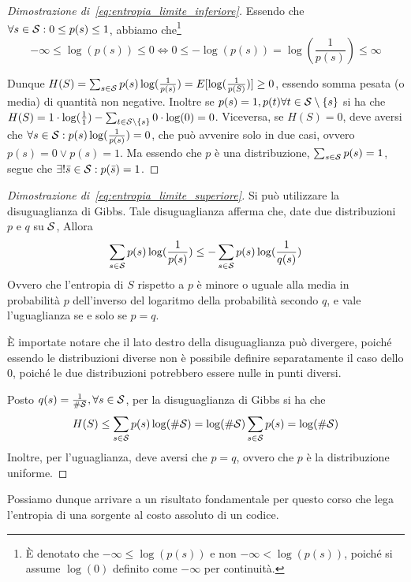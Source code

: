 \begin{proof}[Dimostrazione di~\ref{eq:entropia_limite_inferiore}]
  Essendo che \(\forall s \in \mathcal{S}: 0\leq p(s) \leq 1\), abbiamo che\footnote{È denotato che \(-\infty \leq \log(p(s))\) e non \(-\infty < \log(p(s))\), poiché si assume \(\log(0)\) definito come \(-\infty\) per continuità.}
  \[-\infty \leq \log(p(s)) \leq 0 \iff  0 \leq -\log(p(s)) = \log(\frac{1}{p(s)}) \leq \infty\]

  Dunque \(H(S) = \sum_{s \in \mathcal{S}} p(s) \log(\frac{1}{p(s)}) = E[\log(\frac{1}{p(S)})] \geq 0\), essendo somma pesata (o media) di quantità non negative.
  Inoltre se \(p(s) = 1, p(t) \forall t \in \SCal \setminus \set{s}\) si ha che \(H(S) = 1 \cdot \log(\frac{1}{1}) - \sum_{t \in \SCal \setminus \set{s}} 0 \cdot \log(0) = 0\).
  Viceversa, se \(H(S) = 0\), deve aversi che \(\forall s \in \mathcal{S}: p(s) \log(\frac{1}{p(s)}) = 0\), che può avvenire solo in due casi, ovvero \(p(s) = 0 \lor p(s) = 1\).
  Ma essendo che \(p\) è una distribuzione, \(\sum_{s \in \mathcal{S}} p(s) = 1\), segue che  \(\exists!\bar{s} \in \mathcal{S}: p(\bar{s}) = 1\).
\end{proof}

\begin{proof}[Dimostrazione di~\ref{eq:entropia_limite_superiore}]
  Si può utilizzare la disuguaglianza di Gibbs.
  Tale disuguaglianza afferma che, date due distribuzioni \(p\) e \(q\) su \(\mathcal{S}\), Allora
  \[ \sum_{s \in \mathcal{S}} p(s) \log(\frac{1}{p(s)}) \leq -\sum_{s \in \mathcal{S}} p(s) \log(\frac{1}{q(s)})\]
  Ovvero che l'entropia di \(S\) rispetto a \(p\) è minore o uguale alla media in probabilità \(p\) dell'inverso del logaritmo della probabilità secondo \(q\), e vale l'uguaglianza se e solo se \(p = q\).
  \begin{note}
    È importate notare che il lato destro della disuguaglianza può divergere, poiché essendo le distribuzioni diverse non è possibile definire separatamente il caso dello \(0\), poiché le due distribuzioni potrebbero essere nulle in punti diversi.
  \end{note}
  Posto \(q(s) = \frac{1}{\#\mathcal{S}}, \forall s \in \mathcal{S}\), per la disuguaglianza di Gibbs si ha che
  \[H(S) \leq \sum_{s \in \mathcal{S}} p(s) \log(\#\mathcal{S}) = \log(\#\mathcal{S})\sum_{s \in \mathcal{S}} p(s) = \log(\#\mathcal{S})\]
  Inoltre, per l'uguaglianza, deve aversi che \(p = q\), ovvero che \(p\) è la distribuzione uniforme.
\end{proof}

Possiamo dunque arrivare a un risultato fondamentale per questo corso che lega l'entropia di una sorgente al costo assoluto di un codice.

